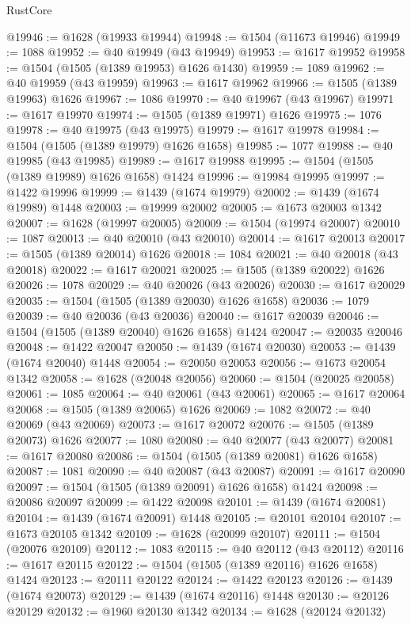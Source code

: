 \begin{lexlean}{RustCore}
\begin{coremodule}
@19946 := @1628 (@19933 @19944)
@19948 := @1504 (@11673 @19946)
@19949 := 1088
@19952 := @40 @19949 (@43 @19949)
@19953 := @1617 @19952
@19958 := @1504 (@1505 (@1389 @19953) @1626 @1430)
@19959 := 1089
@19962 := @40 @19959 (@43 @19959)
@19963 := @1617 @19962
@19966 := @1505 (@1389 @19963) @1626
@19967 := 1086
@19970 := @40 @19967 (@43 @19967)
@19971 := @1617 @19970
@19974 := @1505 (@1389 @19971) @1626
@19975 := 1076
@19978 := @40 @19975 (@43 @19975)
@19979 := @1617 @19978
@19984 := @1504 (@1505 (@1389 @19979) @1626 @1658)
@19985 := 1077
@19988 := @40 @19985 (@43 @19985)
@19989 := @1617 @19988
@19995 := @1504 (@1505 (@1389 @19989) @1626 @1658) @1424
@19996 := @19984 @19995
@19997 := @1422 @19996
@19999 := @1439 (@1674 @19979)
@20002 := @1439 (@1674 @19989) @1448
@20003 := @19999 @20002
@20005 := @1673 @20003 @1342
@20007 := @1628 (@19997 @20005)
@20009 := @1504 (@19974 @20007)
@20010 := 1087
@20013 := @40 @20010 (@43 @20010)
@20014 := @1617 @20013
@20017 := @1505 (@1389 @20014) @1626
@20018 := 1084
@20021 := @40 @20018 (@43 @20018)
@20022 := @1617 @20021
@20025 := @1505 (@1389 @20022) @1626
@20026 := 1078
@20029 := @40 @20026 (@43 @20026)
@20030 := @1617 @20029
@20035 := @1504 (@1505 (@1389 @20030) @1626 @1658)
@20036 := 1079
@20039 := @40 @20036 (@43 @20036)
@20040 := @1617 @20039
@20046 := @1504 (@1505 (@1389 @20040) @1626 @1658) @1424
@20047 := @20035 @20046
@20048 := @1422 @20047
@20050 := @1439 (@1674 @20030)
@20053 := @1439 (@1674 @20040) @1448
@20054 := @20050 @20053
@20056 := @1673 @20054 @1342
@20058 := @1628 (@20048 @20056)
@20060 := @1504 (@20025 @20058)
@20061 := 1085
@20064 := @40 @20061 (@43 @20061)
@20065 := @1617 @20064
@20068 := @1505 (@1389 @20065) @1626
@20069 := 1082
@20072 := @40 @20069 (@43 @20069)
@20073 := @1617 @20072
@20076 := @1505 (@1389 @20073) @1626
@20077 := 1080
@20080 := @40 @20077 (@43 @20077)
@20081 := @1617 @20080
@20086 := @1504 (@1505 (@1389 @20081) @1626 @1658)
@20087 := 1081
@20090 := @40 @20087 (@43 @20087)
@20091 := @1617 @20090
@20097 := @1504 (@1505 (@1389 @20091) @1626 @1658) @1424
@20098 := @20086 @20097
@20099 := @1422 @20098
@20101 := @1439 (@1674 @20081)
@20104 := @1439 (@1674 @20091) @1448
@20105 := @20101 @20104
@20107 := @1673 @20105 @1342
@20109 := @1628 (@20099 @20107)
@20111 := @1504 (@20076 @20109)
@20112 := 1083
@20115 := @40 @20112 (@43 @20112)
@20116 := @1617 @20115
@20122 := @1504 (@1505 (@1389 @20116) @1626 @1658) @1424
@20123 := @20111 @20122
@20124 := @1422 @20123
@20126 := @1439 (@1674 @20073)
@20129 := @1439 (@1674 @20116) @1448
@20130 := @20126 @20129
@20132 := @1960 @20130 @1342
@20134 := @1628 (@20124 @20132)

\end{coremodule}
\end{lexlean}
